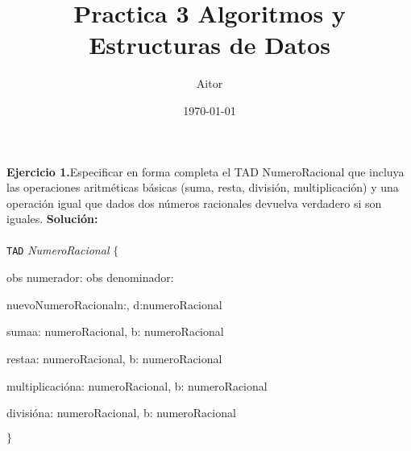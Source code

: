 \documentclass{article}
\title{Practica 3 Algoritmos y Estructuras de Datos}
\author{Aitor}
\date{\today}
\newenvironment{tad}[1]{
	\paragraph{} \vspace*{-4mm}
	\newcommand{\obs}[2]{\texttt{obs} ##1 : ##2}

	\vspace{1ex}
	\texttt{TAD} \textit{#1} $\{$
	\par
	\tocarEspacios
}
{

\hspace{2.5mm} $\}$
\vspace{2ex}
}
\begin{document}
\maketitle

\textbf{Ejercicio 1.}Especificar en forma completa el TAD NumeroRacional que incluya las operaciones aritm\'eticas b\'asicas (suma,
resta, divisi\'on, multiplicaci\'on) y una operaci\'on igual que dados dos n\'umeros racionales devuelva verdadero si son iguales.
\textbf{Soluci\'on:}

\begin{tad}{NumeroRacional}
    obs numerador: \ent
    obs denominador: \ent

    \begin{proc}{nuevoNumeroRacional}{\In n:\ent, \In d:\ent}{numeroRacional}
    \end{proc}

    \begin{proc}{suma}{\Inout a: numeroRacional, \In b: numeroRacional}{}
    \end{proc}

    \begin{proc}{resta}{\Inout a: numeroRacional, \In b: numeroRacional}{}
    \end{proc}
    
    \begin{proc}{multiplicaci\'on}{\Inout a: numeroRacional, \In b: numeroRacional}{}
    \end{proc}

    \begin{proc}{divisi\'on}{\Inout a: numeroRacional, \In b: numeroRacional}{}
    \end{proc}

\end{tad}
\end{document}
